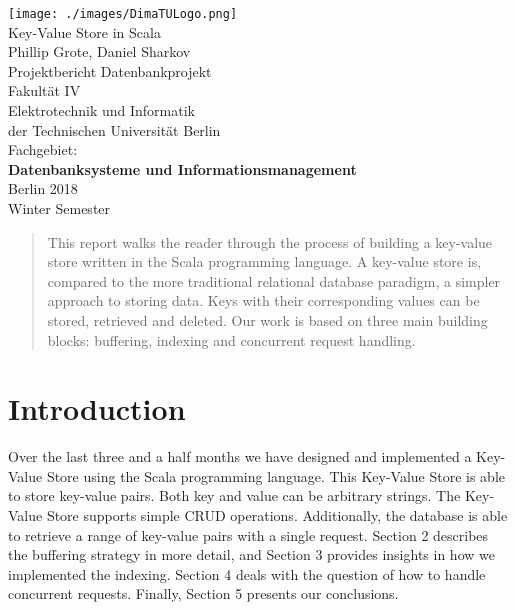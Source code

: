 \documentclass[a4paper, twocolumn,11pt]{article}
\begin{document}
\begin{titlepage}
  \linespread{1.00}
  \begin{center}
    \texttt{[image: ./images/DimaTULogo.png]}\\[1cm]
    \Huge
    Key-Value Store in Scala\\[1cm]
    \large
    Phillip Grote, Daniel Sharkov\\[1cm]
    Projektbericht Datenbankprojekt\\
    Fakult\"{a}t IV\\
    Elektrotechnik und Informatik\\
    der Technischen Universit\"{a}t Berlin\\[1cm]
    Fachgebiet:\\
    \textbf{Datenbanksysteme und Informationsmanagement}\\[2.5cm]
    Berlin 2018\\
    Winter Semester\\ 
  \end{center}
\end{titlepage}
\onecolumn
\tableofcontents
\newpage
\twocolumn 
\begin{abstract}
This report walks the reader through the process of building a key-value store written in the Scala programming language. A key-value store is, compared to the more traditional relational database paradigm, a simpler approach to storing data. Keys with their corresponding values can be stored, retrieved and deleted. Our work is based on three main building blocks: buffering, indexing and concurrent request handling.
\end{abstract}

\section{Introduction}
Over the last three and a half months we have designed and implemented a Key-Value Store using the Scala programming language. This Key-Value Store is able to store key-value pairs. Both key and value can be arbitrary strings. The Key-Value Store supports simple CRUD operations. Additionally, the database is able to retrieve a range of key-value pairs with a single request. 
Section 2 describes the buffering strategy in more detail, and Section 3 provides insights in how we implemented the indexing. Section 4 deals with the question of how to handle concurrent requests. Finally, Section 5 presents our conclusions. 
\end{document}
